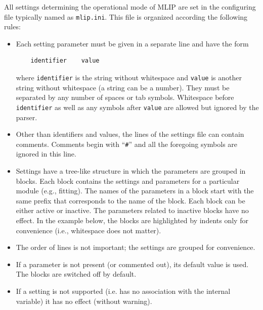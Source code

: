 \documentclass[12pt]{article}
\renewcommand{\_}{\char`_}
\begin{document}
All settings determining the operational mode of MLIP are set in the configuring file typically named as \texttt{mlip.ini}.
This file is organized according the following rules:
\begin{itemize}
	\item Each setting parameter must be given in a separate line and have the form 
	\begin{verbatim}
	identifier    value
	\end{verbatim}
	where \texttt{identifier} is the string without whitespace and \texttt{value} is another string without whitespace (a string can be a number). They must be separated by any number of spaces or tab symbols.
	Whitespace before \texttt{identifier} as well as any symbols after \texttt{value} are allowed but ignored by the parser. 
	
	\item Other than identifiers and values, the lines of the settings file can contain comments. Comments begin with ``\texttt{\#}'' and all the foregoing symbols are ignored in this line. 
	
	\item Settings have a tree-like structure in which the parameters are grouped in blocks. Each block contains the settings and parameters for a particular module (e.g., fitting).
	The names of the parameters in a block start with the same prefix that corresponds to the name of the block.
	Each block can be either active or inactive.
	The parameters related to inactive blocks have no effect.
	In the example below, the blocks are highlighted by indents only for convenience (i.e., whitespace does not matter). 
	
	\item The order of lines is not important; the settings are grouped for convenience.
	
	\item If a parameter is not present (or commented out), its default value is used. The blocks are switched off by default.
	
	\item If a setting is not supported (i.e. has no association with the internal variable) it has no effect (without warning).
\end{itemize}
\end{document}
